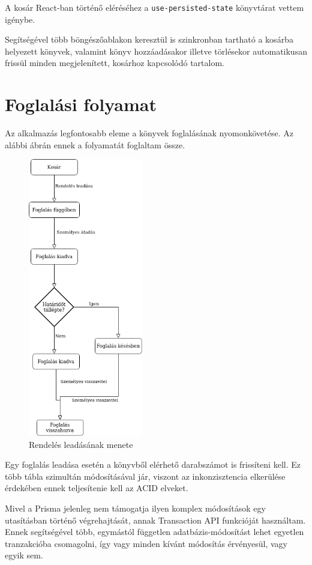A kosár React-ban történő eléréséhez a \lstinline|use-persisted-state| könyvtárat vettem igénybe.

Segítségével több böngészőablakon keresztül is szinkronban tartható a kosárba helyezett könyvek,
valamint könyv hozzáadásakor illetve törlésekor automatikusan frissül minden megjelenített, kosárhoz kapcsolódó tartalom.

\section{Foglalási folyamat}

Az alkalmazás legfontosabb eleme a könyvek foglalásának nyomonkövetése. Az alábbi ábrán ennek a folyamatát foglaltam össze.

\begin{figure}[!ht]
  \centering
  \includegraphics[width=50mm, keepaspectratio]{figures/order-flowchart.png}
  \caption{Rendelés leadásának menete}
  \label{fig:OrderChart}
\end{figure}

Egy foglalás leadása esetén a könyvből elérhető darabszámot is frissíteni kell. Ez több tábla szimultán módosításával jár,
viszont az inkonzisztencia elkerülése érdekében ennek teljesítenie kell az ACID elveket.

Mivel a Prisma jelenleg nem támogatja ilyen komplex módosítások egy utasításban történő végrehajtását, annak Transaction API
funkcióját használtam. Ennek segítségével több, egymástól független adatbázis-módosítást lehet egyetlen tranzakcióba csomagolni,
így vagy minden kívánt módosítás érvényesül, vagy egyik sem.

